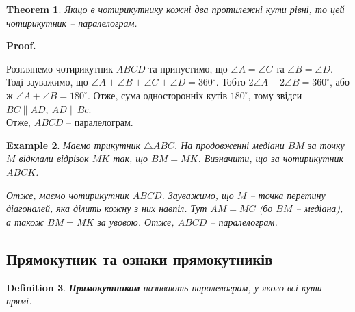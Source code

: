 \documentclass[a4paper, 10pt]{article}
\makeatletter
\theoremstyle{theoremdd}
\newtheorem{theorem}{Theorem}[subsection]
\theoremstyle{theoremdd}
\theoremstyle{theoremdd}
\newtheorem{definition}[theorem]{Definition}
\theoremstyle{theoremdd}
\theoremstyle{theoremdd}
\newtheorem{example}[theorem]{Example}
\theoremstyle{theoremdd}
\theoremstyle{theoremdd}
\theoremstyle{theoremdd}
\theoremstyle{theoremdd}
\renewenvironment{proof}[1][Proof.\\]{\par
\pushQED{\hfill \qed}%
\normalfont \topsep6\p@\@plus6\p@\relax
\trivlist
\item\relax
{\bfseries
#1\@addpunct{.}}\hspace\labelsep\ignorespaces
}{%
\popQED\endtrivlist\@endpefalse
}
\makeatother
\begin{document}
\begin{theorem}
Якщо в чотирикутнику кожні два протилежні кути рівні, то цей чотирикутник -- паралелограм.
\end{theorem}

\begin{proof}
Розглянемо чотирикутник $ABCD$ та припустимо, що $\angle A = \angle C$ та $\angle B = \angle D$. Тоді зауважимо, що $\angle A + \angle B + \angle C + \angle D = 360^\circ$. Тобто $2 \angle A + 2 \angle B = 360^\circ$, або ж $\angle A + \angle B = 180^\circ$. Отже, сума односторонніх кутів $180^\circ$, тому звідси $BC \parallel AD,\ AD \parallel Bc$.\\
Отже, $ABCD$ -- паралелограм.
\end{proof}

\begin{example}
\label{create_parallelogram_through_triangle_and_median}
Маємо трикутник $\triangle ABC$. На продовженні медіани $BM$ за точку $M$ відклали відрізок $MK$ так, що $BM = MK$. Визначити, що за чотирикутник $ABCK$.
\begin{figure}[H]
\centering
{}
\end{figure}
Отже, маємо чотирикутник $ABCD$. Зауважимо, що $M$ -- точка перетину діагоналей, яка ділить кожну з них навпіл. Тут $AM = MC$ (бо $BM$ -- медіана), а також $BM = MK$ за увовою. Отже, $ABCD$ -- паралелограм.
\end{example}

\subsection{Прямокутник та ознаки прямокутників}
\begin{definition}
\textbf{Прямокутником} називають паралелограм, у якого всі кути -- прямі.
\begin{figure}[H]
\centering
{}
\end{figure}
\end{definition}
\end{document}
